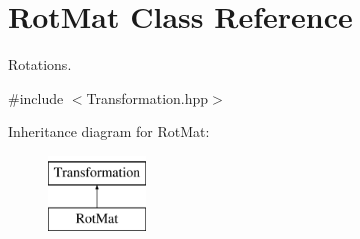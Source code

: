 \hypertarget{class_rot_mat}{\section{Rot\-Mat Class Reference}
\label{class_rot_mat}
}


Rotations.  




{\ttfamily \#include $<$Transformation.\-hpp$>$}

Inheritance diagram for Rot\-Mat\-:\begin{figure}[H]
\begin{center}
\leavevmode
\includegraphics[height=2.000000cm]{class_rot_mat}
\end{center}
\end{figure}
